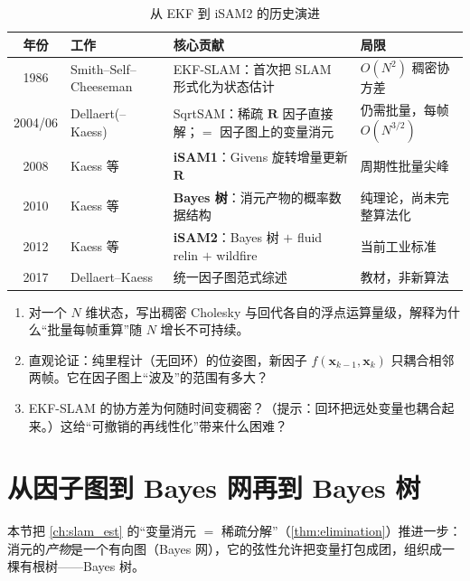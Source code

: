 \begin{table}[H]\centering\small
\caption{从 EKF 到 iSAM2 的历史演进}
\label{tab:isam-history}
\begin{tabular}{cllp{}}
\toprule
年份 & 工作 & 核心贡献 & 局限 \\
\midrule
1986 & Smith--Self--Cheeseman\cite{smith1986estimating} & EKF-SLAM：首次把 SLAM 形式化为状态估计 & $O(N^2)$ 稠密协方差 \\
2004/06 & Dellaert(--Kaess)\cite{dellaert2006square} & SqrtSAM：稀疏 $\mathbf{R}$ 因子直接解；$=$ 因子图上的变量消元 & 仍需批量，每帧 $O(N^{3/2})$ \\
2008 & Kaess 等\cite{kaess2008isam} & \textbf{iSAM1}：Givens 旋转增量更新 $\mathbf{R}$ & 周期性批量尖峰 \\
2010 & Kaess 等\cite{kaess2010bayestree} & \textbf{Bayes 树}：消元产物的概率数据结构 & 纯理论，尚未完整算法化 \\
2012 & Kaess 等\cite{kaess2012isam2} & \textbf{iSAM2}：Bayes 树 $+$ fluid relin $+$ wildfire & 当前工业标准 \\
2017 & Dellaert--Kaess\cite{dellaert2017factor} & 统一因子图范式综述 & 教材，非新算法 \\
\bottomrule
\end{tabular}
\end{table}

\begin{practice}
\begin{enumerate}
  \item 对一个 $N$ 维状态，写出稠密 Cholesky 与回代各自的浮点运算量级，解释为什么“批量每帧重算”随 $N$ 增长不可持续。
  \item 直观论证：纯里程计（无回环）的位姿图，新因子 $f(\mathbf{x}_{k-1},\mathbf{x}_k)$ 只耦合相邻两帧。它在因子图上“波及”的范围有多大？
  \item EKF-SLAM 的协方差为何随时间变稠密？（提示：回环把远处变量也耦合起来。）这给“可撤销的再线性化”带来什么困难？
\end{enumerate}
\end{practice}

\section{从因子图到 Bayes 网再到 Bayes 树}
\label{sec:isam-fg2tree}

本节把 \cref{ch:slam_est} 的“变量消元 $=$ 稀疏分解”（\cref{thm:elimination}）推进一步：消元的\emph{产物}是一个有向图（Bayes 网），它的弦性允许把变量打包成团，组织成一棵有根树——Bayes 树。

